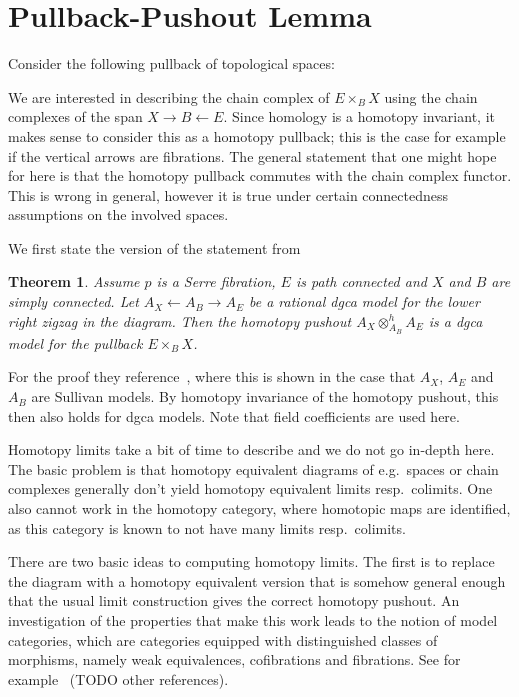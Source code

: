 \documentclass{scrartcl}
\theoremstyle{plain}
\newtheorem{theorem}{Theorem}[section]
\theoremstyle{definition}
\begin{document}
\section{Pullback-Pushout Lemma}
Consider the following pullback of topological spaces:
\begin{center}
\end{center}

We are interested in describing the chain complex of $E\times_B X$ using the chain complexes of the span $X \to B \leftarrow E$. Since homology is a homotopy invariant, it makes sense to consider this as a homotopy pullback; this is the case for example if the vertical arrows are fibrations. The general statement that one might hope for here is that the homotopy pullback commutes with the chain complex functor. This is wrong in general, however it is true under certain connectedness assumptions on the involved spaces. 

We first state the version of the statement from~\cite{felix2012rational}
\begin{theorem}
Assume $p$ is a Serre fibration, $E$ is path connected and $X$ and $B$ are simply connected. Let $A_X \leftarrow A_B \rightarrow A_E$ be a rational dgca model for the lower right zigzag in the diagram. Then the homotopy pushout $A_X \otimes_{A_B}^h A_E$ is a dgca model for the pullback $E\times_B X$.  
\end{theorem}
For the proof they reference~\cite[Proposition 15.8]{naef2022string}, where this is shown in the case that $A_X$, $A_E$ and $A_B$ are Sullivan models. By homotopy invariance of the homotopy pushout, this then also holds for dgca models. Note that field coefficients are used here. 

Homotopy limits take a bit of time to describe and we do not go in-depth here. The basic problem is that homotopy equivalent diagrams of e.g.\ spaces or chain complexes generally don't yield homotopy equivalent limits resp.\ colimits. One also cannot work in the homotopy category, where homotopic maps are identified, as this category is known to not have many limits resp.\ colimits. 

There are two basic ideas to computing homotopy limits. The first is to replace the diagram with a homotopy equivalent version that is somehow general enough that the usual limit construction gives the correct homotopy pushout. An investigation of the properties that make this work leads to the notion of model categories, which are categories equipped with distinguished classes of morphisms, namely weak equivalences, cofibrations and fibrations. See for example~\cite{dwyer1995homotopy} (TODO other references).
\end{document}
